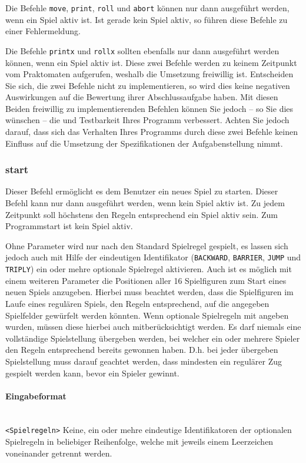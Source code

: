 Die Befehle \texttt{move}, \texttt{print}, \texttt{roll} und \texttt{abort} können nur dann ausgeführt werden, wenn ein Spiel aktiv ist. Ist gerade kein Spiel aktiv, so führen diese Befehle zu einer Fehlermeldung.

Die Befehle \texttt{printx} und \texttt{rollx} sollten ebenfalls nur dann ausgeführt werden können, wenn ein Spiel aktiv ist. Diese zwei Befehle werden zu keinem Zeitpunkt vom Praktomaten aufgerufen, weshalb die Umsetzung freiwillig ist. Entscheiden Sie sich, die zwei Befehle nicht zu implementieren, so wird dies keine negativen Auswirkungen auf die Bewertung ihrer Abschlussaufgabe haben. Mit diesen Beiden freiwillig zu implementierenden Befehlen können Sie jedoch -- so Sie dies wünschen -- die  und Testbarkeit Ihres Programm verbessert. Achten Sie jedoch darauf, dass sich das Verhalten Ihres Programms durch diese zwei Befehle keinen Einfluss auf die Umsetzung der Spezifikationen der Aufgabenstellung nimmt.


\subsubsection*{start}
Dieser Befehl ermöglicht es dem Benutzer ein neues Spiel zu starten. Dieser Befehl kann nur dann ausgeführt werden, wenn kein Spiel aktiv ist. Zu jedem Zeitpunkt soll höchstens den Regeln entsprechend ein Spiel aktiv sein. Zum Programmstart ist kein Spiel aktiv.

Ohne Parameter wird nur nach den Standard Spielregel gespielt, es lassen sich jedoch auch mit Hilfe der eindeutigen Identifikator (\texttt{BACKWARD}, \texttt{BARRIER}, \texttt{JUMP} und \texttt{TRIPLY}) ein oder mehre optionale Spielregel aktivieren. 
Auch ist es möglich mit einem weiteren Parameter die Positionen aller 16 Spielfiguren zum Start eines neuen Spiels anzugeben. Hierbei muss beachtet werden, dass die Spielfiguren im Laufe eines regulären Spiels, den Regeln entsprechend, auf die angegeben Spielfelder gewürfelt werden könnten. Wenn optionale Spielregeln mit angeben wurden, müssen diese hierbei auch mitberücksichtigt werden. Es darf niemals eine vollständige Spielstellung übergeben werden, bei welcher ein oder mehrere Spieler den Regeln entsprechend bereits gewonnen haben. D.h. bei jeder übergeben Spielstellung muss darauf geachtet werden, dass mindesten ein regulärer Zug gespielt werden kann, bevor ein Spieler gewinnt. 

\paragraph*{Eingabeformat}
\\
\texttt{<Spielregeln>} Keine, ein oder mehre eindeutige Identifikatoren der optionalen Spielregeln in beliebiger Reihenfolge, welche mit jeweils einem Leerzeichen voneinander getrennt werden.

